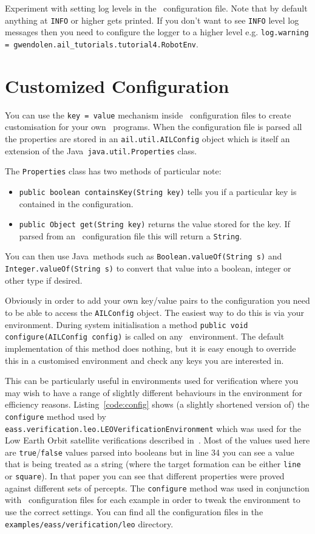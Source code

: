 \documentclass[a4]{article}
\begin{document}
Experiment with setting log levels in the \ail\ configuration file.  Note that by default anything at \texttt{INFO} or higher gets printed.  If you don't want to see \texttt{INFO} level log messages then you need to configure the logger to a higher level e.g. \texttt{log.warning = gwendolen.ail\_tutorials.tutorial4.RobotEnv}.

\section{Customized Configuration}

You can use the \texttt{key = value} mechanism inside \ail\ configuration files to create customisation for your own \ail\ programs.  When the configuration file is parsed all the properties are stored in an \texttt{ail.util.AILConfig} object which is itself an extension of the Java\ \texttt{java.util.Properties} class.  

The \texttt{Properties} class has two methods of particular note:
\begin{itemize}
\item \texttt{public boolean containsKey(String key)} tells you if a particular key is contained in the configuration.  
\item \texttt{public Object get(String key)} returns the value stored for the key.  If parsed from an \ail\ configuration file this will return a \texttt{String}.
\end{itemize}
You can then use Java\ methods such as \texttt{Boolean.valueOf(String s)} and \texttt{Integer.valueOf(String s)} to convert that value into a boolean, integer or other type if desired.

Obviously in order to add your own key/value pairs to the configuration you need to be able to access the \texttt{AILConfig} object.  The easiest way to do this is via your environment.  During system initialisation a method \texttt{public void configure(AILConfig config)} is called on any \ail\ environment.  The default implementation of this method does nothing, but it is easy enough to override this in a customised environment and check any keys you are interested in.

This can be particularly useful in environments used for verification where you may wish to have a range of slightly different behaviours in the environment for efficiency reasons.  Listing~\ref{code:config} shows (a slightly shortened version of) the \texttt{configure} method used by \texttt{eass.verification.leo.LEOVerificationEnvironment} which was used for the Low Earth Orbit satellite verifications described in~\cite{dennis14:_pract}.  Most of the values used here are \texttt{true}/\texttt{false} values parsed into booleans but in line 34 you can see a value that is being treated as a string (where the target formation can be either \texttt{line} or \texttt{square}).  In that paper you can see that different properties were proved against different sets of percepts.  The \texttt{configure} method was used in conjunction with \ail\ configuration files for each example in order to tweak the environment to use the correct settings.  You can find all the configuration files in the \texttt{examples/eass/verification/leo} directory.
\end{document}
